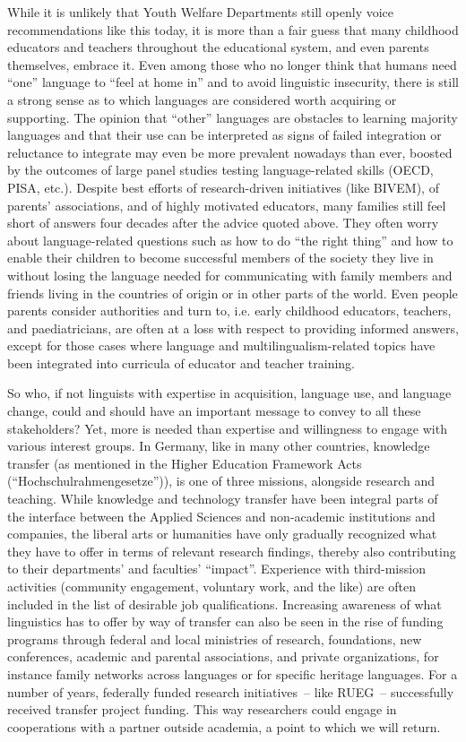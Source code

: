 \documentclass[output=paper,colorlinks,citecolor=brown]{langscibook}
\begin{document}
While it is unlikely that Youth Welfare Departments still openly voice recommendations like this today, it is more than a fair guess that many childhood educators and teachers throughout the educational system, and even parents themselves, embrace it. Even among those who no longer think that humans need “one” language to “feel at home in” and to avoid linguistic insecurity, there is still a strong sense as to which languages are considered worth acquiring or supporting. The opinion that ``other'' languages are obstacles to learning majority languages and that their use can be interpreted as signs of failed integration or reluctance to integrate may even be more prevalent nowadays than ever, boosted by the outcomes of large panel studies testing language-related skills (OECD, PISA, etc.). Despite best efforts of research-driven initiatives (like BIVEM), of parents’ associations, and of highly motivated educators, many families still feel short of answers four decades after the advice quoted above. They often worry about language-related questions such as how to do ``the right thing'' and how to enable their children to become successful members of the society they live in without losing the language needed for communicating with family members and friends living in the countries of origin or in other parts of the world. Even people parents consider authorities and turn to, i.e. early childhood educators, teachers, and paediatricians, are often at a loss with respect to providing informed answers, except for those cases where language and multilingualism\hyp related topics have been integrated into curricula of educator and teacher training.

So who, if not linguists with expertise in acquisition, language use, and language change, could and should have an important message to convey to all these stakeholders? Yet, more is needed than expertise and willingness to engage with various interest groups. In Germany, like in many other countries, knowledge transfer (as mentioned in the Higher Education Framework Acts (``Hochschulrahmengesetze'')), is one of three missions, alongside research and teaching. While knowledge and technology transfer have been integral parts of the interface between the Applied Sciences and non-academic institutions and companies, the liberal arts or humanities have only gradually recognized what they have to offer in terms of relevant research findings, thereby also contributing to their departments’ and faculties’ “impact”. Experience with third-mission activities (community engagement, voluntary work, and the like) are often included in the list of desirable job qualifications. Increasing awareness of what linguistics has to offer by way of transfer can also be seen in the rise of funding programs through federal and local ministries of research, foundations, new conferences, academic and parental associations, and private organizations, for instance family networks across languages or for specific heritage languages. For a number of years, federally funded research initiatives~– like RUEG~– successfully received transfer project funding. This way researchers could engage in cooperations with a partner outside academia, a point to which we will return.
\end{document}
